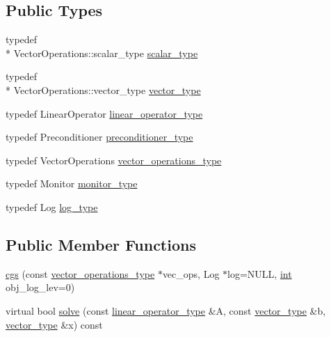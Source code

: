 \subsection*{Public Types}
\begin{DoxyCompactItemize}
\item 
typedef \\*
Vector\-Operations\-::scalar\-\_\-type \hyperlink{classnumerical__algos_1_1lin__solvers_1_1cgs_a11a8155d321473c5940d28c23808154d}{scalar\-\_\-type}
\item 
typedef \\*
Vector\-Operations\-::vector\-\_\-type \hyperlink{classnumerical__algos_1_1lin__solvers_1_1cgs_aed6c8f0092b08fb3d0690c215cced5f9}{vector\-\_\-type}
\item 
typedef Linear\-Operator \hyperlink{classnumerical__algos_1_1lin__solvers_1_1cgs_a9aa9a945e8f133f9ef15f83a7a7880dc}{linear\-\_\-operator\-\_\-type}
\item 
typedef Preconditioner \hyperlink{classnumerical__algos_1_1lin__solvers_1_1cgs_ade373d56aec3d0a0c6414f773ca4f97f}{preconditioner\-\_\-type}
\item 
typedef Vector\-Operations \hyperlink{classnumerical__algos_1_1lin__solvers_1_1cgs_a249281fa342a90567f6344a57191fde9}{vector\-\_\-operations\-\_\-type}
\item 
typedef Monitor \hyperlink{classnumerical__algos_1_1lin__solvers_1_1cgs_af176eeddd3d6fc34241c1796ba381cf1}{monitor\-\_\-type}
\item 
typedef Log \hyperlink{classnumerical__algos_1_1lin__solvers_1_1cgs_af876166d874a6f33d2d626817605618f}{log\-\_\-type}
\end{DoxyCompactItemize}
\subsection*{Public Member Functions}
\begin{DoxyCompactItemize}
\item 
\hyperlink{classnumerical__algos_1_1lin__solvers_1_1cgs_af4672270c1d567b1d037e5b8c43f9944}{cgs} (const \hyperlink{classnumerical__algos_1_1lin__solvers_1_1cgs_a249281fa342a90567f6344a57191fde9}{vector\-\_\-operations\-\_\-type} $\ast$vec\-\_\-ops, Log $\ast$log=N\-U\-L\-L, \hyperlink{classint}{int} obj\-\_\-log\-\_\-lev=0)
\item 
virtual bool \hyperlink{classnumerical__algos_1_1lin__solvers_1_1cgs_a76503cf7b66739a4fa4571f034aa960e}{solve} (const \hyperlink{classnumerical__algos_1_1lin__solvers_1_1cgs_a9aa9a945e8f133f9ef15f83a7a7880dc}{linear\-\_\-operator\-\_\-type} \&A, const \hyperlink{classnumerical__algos_1_1lin__solvers_1_1cgs_aed6c8f0092b08fb3d0690c215cced5f9}{vector\-\_\-type} \&b, \hyperlink{classnumerical__algos_1_1lin__solvers_1_1cgs_aed6c8f0092b08fb3d0690c215cced5f9}{vector\-\_\-type} \&x) const 
\end{DoxyCompactItemize}
